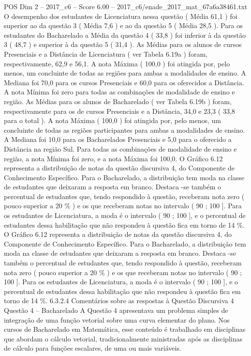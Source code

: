 \begin{textsample}{POS Dim 2 – 2017\_c6 – Score 6.00 – 2017\_c6/enade\_2017\_mat\_67a6a38461.txt}
O desempenho dos estudantes de Licenciatura nessa questão ( Média 61,1 ) foi superior ao da questão 3 ( Média 7,6 ) e ao da questão 5 ( Média 28,5 ).
Para os estudantes do Bacharelado a Média da questão 4 ( 33,8 ) foi inferior à da questão 3 ( 48,7 ) e superior à da questão 5 ( 31,4 ).
As Médias para os alunos de cursos Presenciais e a Distância de Licenciatura ( ver Tabela 6.19a ) foram, respectivamente, 62,9 e 56,1.
A nota Máxima ( 100,0 ) foi atingida por, pelo menos, um concluinte de todas as regiões para ambas a modalidades de ensino.
A Mediana foi 70,0 para os cursos Presenciais e 60,0 para os oferecidos a Distância.
A nota Mínima foi zero para todas as combinações de modalidade de ensino e região.
As Médias para os alunos de Bacharelado ( ver Tabela 6.19b ) foram, respectivamente para os de cursos Presenciais e a Distância, 34,0 e 23,3 ( 33,8 para o total ).
A nota Máxima ( 100,0 ) foi atingida por, pelo menos, um concluinte de todas as regiões participantes para ambas a modalidades de ensino.
A Mediana foi 10,0 para os Bacharelados Presenciais e 5,0 para o oferecido a Distância na região Sul.
Para todas as combinações de modalidade de ensino e região, a nota Mínima foi zero, e a nota Máxima foi 100,0.
O Gráfico 6.12 representa a distribuição de notas da questão discursiva 4, do Componente de Conhecimento Específico.
Para o Bacharelado, a distribuição tem moda na classe de estudantes que deixaram a resposta em branco.
Destaca -se também o percentual de estudantes que, tendo respondido à questão, receberam nota zero ( pouco superior a 20 \% ) e os que receberam notas no intervalo ( 90 ; 100 ].
Para os estudantes de Licenciatura, a moda é o intervalo ( 90 ; 100 ], e o percentual de estudantes dessa habilitação que não respondeu à questão fica em torno de 14 \%.
O Gráfico 6.12 representa a distribuição de notas da questão discursiva 4, do Componente de Conhecimento Específico.
Para o Bacharelado, a distribuição tem moda na classe de estudantes que deixaram a resposta em branco.
Destaca -se também o percentual de estudantes que, tendo respondido à questão, receberam nota zero ( pouco superior a 20 \% ) e os que receberam notas no intervalo ( 90 ; 100 ].
Para os estudantes de Licenciatura, a moda é o intervalo ( 90 ; 100 ], e o percentual de estudantes dessa habilitação que não respondeu à questão fica em torno de 14 \%. 6.3.2.4 Comentários sobre as respostas à Questão Discursiva 4 Questão 4 – Bacharelado A Questão 4 apresentava um problema simples de integração de uma função vetorial sobre uma curva elementar do plano.
Nos cursos de Bacharelado em Matemática, esse conteúdo é trabalhado em disciplinas que abordam o cálculo vetorial, tradicionalmente ministradas após as disciplinas de cálculo para funções escalares, de uma ou mais variáveis.

\end{textsample}
